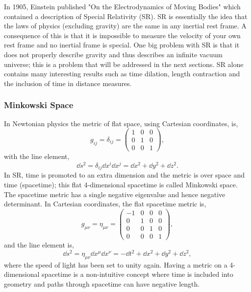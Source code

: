 In 1905, Einstein published "On the Electrodynamics of Moving Bodies" \cite{einstein1905electrodynamics} which contained a description of Special Relativity (SR). SR is essentially the idea that the laws of physics (excluding gravity) are the same in any inertial rest frame. A consequence of this is that it is impossible to measure the velocity of your own rest frame and no inertial frame is special. One big problem with SR is that it does not properly describe gravity and thus describes an infinite vacuum universe; this is a problem that will be addressed in the next sections. SR alone contains many interesting results such as time dilation, length contraction and the inclusion of time in distance measures.

\subsubsection{Minkowski Space}\label{intro:sec:minkowski_space}
In Newtonian physics the metric of flat space, using Cartesian coordinates, is,
\begin{equation}
g_{ij} = \delta_{ij} = \begin{pmatrix} 1 & 0 & 0 \\ 0 & 1 & 0 \\ 0 & 0 & 1 \end{pmatrix},
\end{equation}
with the line element,
\begin{equation}
\dd s ^2 = \delta_{ij} \dd x^i \dd x^j = \dd x^2 + \dd y^2 + \dd z^2.
\end{equation}
In SR, time is promoted to an extra dimension and the metric is over space and time (spacetime); this flat 4-dimensional spacetime is called Minkowski space. The spacetime metric has a single negative eigenvalue and hence negative determinant. In Cartesian coordinates, the flat spacetime metric is,
\begin{equation}
g_{\mu\nu} = \eta_{\mu\nu} = \begin{pmatrix} -1 &0 &0 &0\\ 0 & 1 & 0 & 0 \\ 0 & 0 & 1 & 0 \\ 0 & 0 & 0 & 1 \end{pmatrix},
\end{equation}
and the line element is,
\begin{equation}
\dd s ^2 = \eta_{\mu\nu} \dd x^\mu \dd x^\nu = -\dd t^2 + \dd x^2 + \dd y^2 + \dd z^2,
\end{equation}
where the speed of light has been set to unity again. Having a metric on a 4-dimensional spacetime is a non-intuitive concept where time is included into geometry and paths through spacetime can have negative length.

